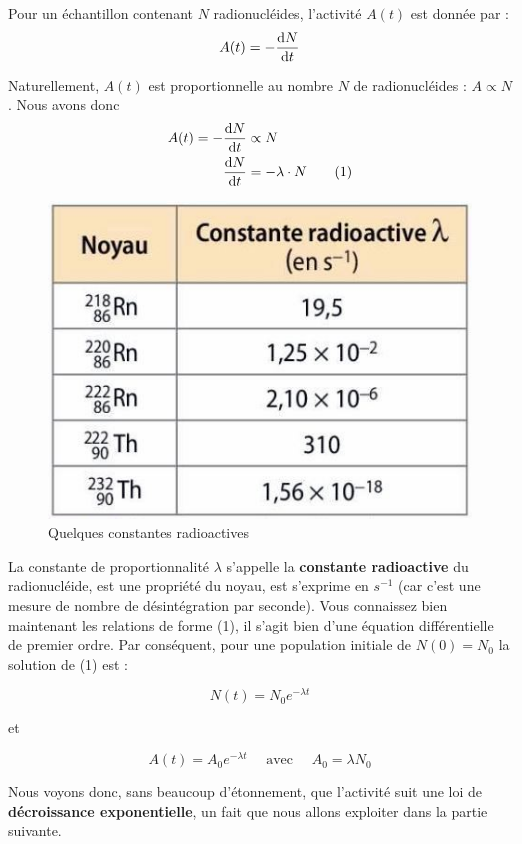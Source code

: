 \documentclass[11pt,a4paper]{article}
\begin{document}
Pour un échantillon contenant $N$ radionucléides, l'activité $A(t)$ est donnée par : \[ A(t) = - \diff{N}{t} \]

Naturellement, $A(t)$ est proportionnelle au nombre $N$ de radionucléides : $A \propto N$. Nous avons donc 
\begin{align*}
    A(t) = - \diff{N}{t} &  \propto N \\
    \diff{N}{t} &= -\lambda \cdot N \tag{1}
\end{align*}

\begin{figure}
\centering
\includegraphics[width=0.95\linewidth]{imgs/p8/lambdatable.jpg}
\caption{Quelques constantes radioactives}
\end{figure}

La constante de proportionnalité $\lambda$ s'appelle la \textbf{constante radioactive} du radionucléide, est une propriété du noyau, est s'exprime en $s^{-1}$ (car c'est une mesure de nombre de désintégration par seconde).  Vous connaissez bien maintenant les relations de forme (1), il s'agit bien d'une équation différentielle de premier ordre. Par conséquent, pour une population initiale de $N(0) = N_0$ la solution de (1) est : 

\[ N(t) = N_0 e^{-\lambda t}\]

et 

\[ A(t) = A_0 e^{-\lambda t} \quad \text{ avec }\quad A_0 = \lambda N_0\]

Nous voyons donc, sans beaucoup d'étonnement, que l'activité suit une loi de \textbf{décroissance exponentielle}, un fait que nous allons exploiter dans la partie suivante.
\end{document}
